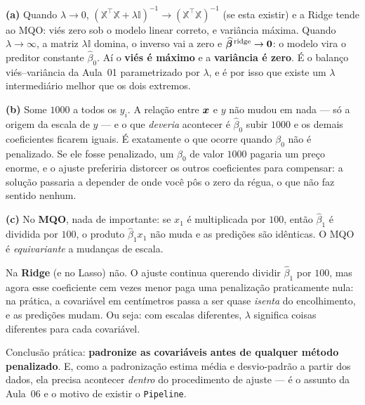 \documentclass[11pt,a4paper]{article}
\begin{document}
\begin{solucao}
\textbf{(a)} Quando $\lambda\to 0$, $(\mathbb{X}^\top\mathbb{X}+\lambda\mathbb{I})^{-1}\to
(\mathbb{X}^\top\mathbb{X})^{-1}$ (se esta existir) e a Ridge tende ao MQO: viés zero sob o
modelo linear correto, e variância máxima. Quando $\lambda\to\infty$, a matriz
$\lambda\mathbb{I}$ domina, o inverso vai a zero e
$\widehat{\bm{\beta}}^{\,\text{ridge}}\to\bm 0$: o modelo vira o preditor constante
$\widehat\beta_0$. Aí o \textbf{viés é máximo} e a \textbf{variância é zero}. É o
balanço viés--variância da Aula~01 parametrizado por $\lambda$, e é por isso que
existe um $\lambda$ intermediário melhor que os dois extremos.

\smallskip
\textbf{(b)} Some $1000$ a todos os $y_i$. A relação entre $\bm{x}$ e $y$ não mudou em
nada --- só a origem da escala de $y$ --- e o que \emph{deveria} acontecer é
$\widehat\beta_0$ subir $1000$ e os demais coeficientes ficarem iguais. É
exatamente o que ocorre quando $\beta_0$ não é penalizado. Se ele fosse
penalizado, um $\beta_0$ de valor $1000$ pagaria um preço enorme, e o ajuste
preferiria distorcer os outros coeficientes para compensar: a solução passaria a
depender de onde você pôs o zero da régua, o que não faz sentido nenhum.

\smallskip
\textbf{(c)} No \textbf{MQO}, nada de importante: se $x_1$ é multiplicada por
$100$, então $\widehat\beta_1$ é dividida por $100$, o produto
$\widehat\beta_1 x_1$ não muda e as predições são idênticas. O MQO é
\emph{equivariante} a mudanças de escala.

Na \textbf{Ridge} (e no Lasso) não. O ajuste continua querendo dividir
$\widehat\beta_1$ por $100$, mas agora esse coeficiente cem vezes menor paga uma
penalização praticamente nula: na prática, a covariável em centímetros passa a ser
quase \emph{isenta} do encolhimento, e as predições mudam. Ou seja: com escalas
diferentes, $\lambda$ significa coisas diferentes para cada covariável.

Conclusão prática: \textbf{padronize as covariáveis antes de qualquer método
penalizado}. E, como a padronização estima média e desvio-padrão a partir dos
dados, ela precisa acontecer \emph{dentro} do procedimento de ajuste --- é o
assunto da Aula~06 e o motivo de existir o \texttt{Pipeline}.
\end{solucao}
\end{document}
